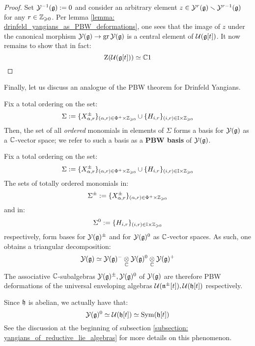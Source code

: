            \begin{proof}
                Set $\mathcal{Y}^{-1}(\mathfrak{g}) := 0$ and consider an arbitrary element $z \in \mathcal{Y}^r(\mathfrak{g}) \smallsetminus \mathcal{Y}^{r - 1}(\mathfrak{g})$ for any $r \in \mathbb{Z}_{\geqslant 0}$. Per lemma \ref{lemma: drinfeld_yangians_as_PBW_deformations}, one sees that the image of $z$ under the canonical morphism $\mathcal{Y}(\mathfrak{g}) \to \operatorname{gr} \mathcal{Y}(\mathfrak{g})$ is a central element of $\mathcal{U}(\mathfrak{g}[t])$. It now remains to show that in fact:
                    $$\mathrm{Z}( \mathcal{U}(\mathfrak{g}[t]) ) \simeq \mathbb{C} 1$$
            \end{proof}

        Finally, let us discuss an analogue of the PBW theorem for Drinfeld Yangians.
        \begin{theorem} \label{theorem: PBW_bases_for_drinfeld_yangians}
            \cite[Proposition 12.1.8]{chari_pressley_quantum_groups} Fix a total ordering on the set:
                $$\Sigma := \{X_{\alpha, r}^{\pm}\}_{(\alpha, r) \in \Phi^+ \x \Z_{\geq 0}} \cup \{H_{i, r}\}_{(i, r) \in \simpleroots \x \Z_{\geq 0}}$$
            Then, the set of all \textit{ordered} monomials in elements of $\Sigma$ forms a basis for $\mathcal{Y}(\mathfrak{g})$ as a $\mathbb{C}$-vector space; we refer to such a basis as a \textbf{PBW basis} of $\mathcal{Y}(\mathfrak{g})$. 
        \end{theorem}
        \begin{corollary} \label{coro: triangular_decompositions_of_drinfeld_yangians}
            Fix a total ordering on the set:
                $$\Sigma := \{X_{\alpha, r}^{\pm}\}_{(\alpha, r) \in \Phi^+ \x \Z_{\geq 0}} \cup \{H_{i, r}\}_{(i, r) \in \simpleroots \x \Z_{\geq 0}}$$
            The sets of totally ordered monomials in:
                $$\Sigma^{\pm} := \{X_{\alpha, r}^{\pm}\}_{(\alpha, r) \in \Phi^+ \x \Z_{\geq 0}}$$
            and in:
                $$\Sigma^0 := \{H_{i, r}\}_{(i, r) \in \simpleroots \x \Z_{\geq 0}}$$
            respectively, form bases for $\mathcal{Y}(\mathfrak{g})^{\pm}$ and for $\mathcal{Y}(\mathfrak{g})^0$ as $\mathbb{C}$-vector spaces. As such, one obtains a triangular decomposition:
                $$\calY(\g) \cong \calY(\g)^- \tensor_{\bbC} \calY(\g)^0 \tensor_{\bbC} \calY(\g)^+$$
            The associative $\mathbb{C}$-subalgebras $\mathcal{Y}(\mathfrak{g})^{\pm}, \mathcal{Y}(\mathfrak{g})^0$ of $\mathcal{Y}(\mathfrak{g})$ are therefore PBW deformations of the universal enveloping algebras $\mathcal{U}(\mathfrak{n}^{\pm}[t]), \mathcal{U}(\mathfrak{h}[t])$ respectively. 
        \end{corollary}
        \begin{remark}
            Since $\mathfrak{h}$ is abelian, we actually have that:
                $$\mathcal{Y}(\mathfrak{g})^0 \simeq \mathcal{U}(\mathfrak{h}[t]) \simeq \mathrm{Sym}(\mathfrak{h}[t])$$
            See the discussion at the beginning of subsection \ref{subsection: yangians_of_reductive_lie_algebras} for more details on this phenomenon. 
        \end{remark}

